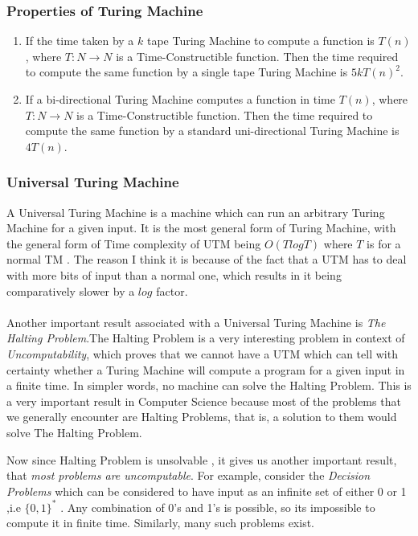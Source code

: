 \documentclass[12pt,a4paper]{extarticle}
\begin{document}
\subsubsection{Properties of Turing Machine} 
\begin{enumerate}
 \item If the time taken by a $k$ tape Turing Machine to compute a function is $T(n)$, where $T:N\rightarrow N$ is a Time-Constructible function. Then the time required to compute the same function by a single tape Turing Machine is $5kT(n)^2$.
 
 \newpage
 
 \item If a bi-directional Turing Machine computes a function in time $T(n)$, where $T:N\rightarrow N$ is a Time-Constructible function. Then the time required to compute the same function by a standard uni-directional Turing Machine is $4T(n)$.
\end{enumerate}

\subsubsection{Universal Turing Machine}
A Universal Turing Machine is a machine which can run an arbitrary Turing Machine for a given input. It is the most general form of Turing Machine, with the general form of Time complexity of UTM being $O(TlogT)$ where $T$ is for a normal TM . The reason I think it is because of the fact that a UTM has to deal with more bits of input than a normal one, which results in it being comparatively slower by a $log$ factor.\\\\
Another important result associated with a Universal Turing Machine is \textit{The Halting Problem}.The Halting Problem is a very interesting problem in context of \textit{Uncomputability}, which proves that we cannot have a UTM which can tell with certainty whether a Turing Machine will compute a program for a given input in a finite time. In simpler words, no machine can solve the Halting Problem. This is a very important result in Computer Science because most of the problems that we generally encounter are Halting Problems, that is, a solution to them would solve The Halting Problem.\par
Now since Halting Problem is unsolvable , it gives us another important result, that \textit{most problems are uncomputable}. For example, consider the \textit{Decision Problems} which can be considered to have input as an infinite set of either 0 or 1 ,i.e $\{0,1\}^*$ . Any combination of 0's and 1's is possible, so its impossible to compute it in finite time. Similarly, many such problems exist.\par
\end{document}
